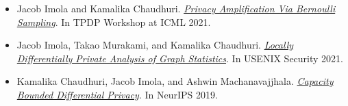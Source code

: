 \documentclass[12pt]{ucsddissertation}
\begin{document}
\begin{vita}
\begin{itemize}
\item Jacob Imola and Kamalika Chaudhuri.
		\textit{\href{https://arxiv.org/abs/2105.10594}{Privacy Amplification Via Bernoulli Sampling}}. In TPDP Workshop at ICML 2021.

\item Jacob Imola, Takao Murakami, and Kamalika Chaudhuri.
		\textit{\href{https://arxiv.org/abs/2010.08688}{Locally Differentially Private Analysis of Graph Statistics}}. In USENIX Security 2021.

\item Kamalika Chaudhuri, Jacob Imola, and Ashwin Machanavajjhala.
		\textit{\href{https://arxiv.org/abs/1907.02159}{Capacity Bounded Differential Privacy}}.
	  In NeurIPS 2019.
\end{itemize}

\end{vita}
\end{document}
